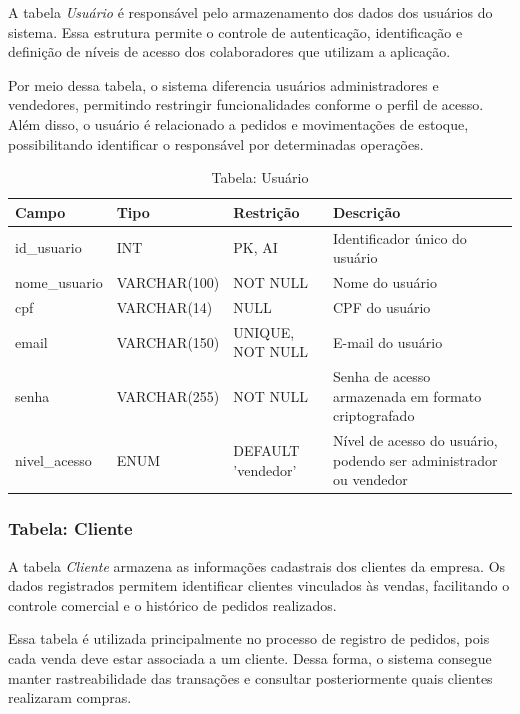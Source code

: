 A tabela \textit{Usuário} é responsável pelo armazenamento dos dados dos usuários do sistema. Essa estrutura permite o controle de autenticação, identificação e definição de níveis de acesso dos colaboradores que utilizam a aplicação.

Por meio dessa tabela, o sistema diferencia usuários administradores e vendedores, permitindo restringir funcionalidades conforme o perfil de acesso. Além disso, o usuário é relacionado a pedidos e movimentações de estoque, possibilitando identificar o responsável por determinadas operações.

\begin{table}[H]
\centering
\begin{tabular}{|p{3cm}|p{3cm}|p{3cm}|p{5cm}|}
\hline
\textbf{Campo} & \textbf{Tipo} & \textbf{Restrição} & \textbf{Descrição} \\ \hline
id\_usuario & INT & PK, AI & Identificador único do usuário \\ \hline
nome\_usuario & VARCHAR(100) & NOT NULL & Nome do usuário \\ \hline
cpf & VARCHAR(14) & NULL & CPF do usuário \\ \hline
email & VARCHAR(150) & UNIQUE, NOT NULL & E-mail do usuário \\ \hline
senha & VARCHAR(255) & NOT NULL & Senha de acesso armazenada em formato criptografado \\ \hline
nivel\_acesso & ENUM & DEFAULT 'vendedor' & Nível de acesso do usuário, podendo ser administrador ou vendedor \\ \hline
\end{tabular}
\caption{Tabela: Usuário}
\end{table}

\subsubsection{Tabela: Cliente}

A tabela \textit{Cliente} armazena as informações cadastrais dos clientes da empresa. Os dados registrados permitem identificar clientes vinculados às vendas, facilitando o controle comercial e o histórico de pedidos realizados.

Essa tabela é utilizada principalmente no processo de registro de pedidos, pois cada venda deve estar associada a um cliente. Dessa forma, o sistema consegue manter rastreabilidade das transações e consultar posteriormente quais clientes realizaram compras.

